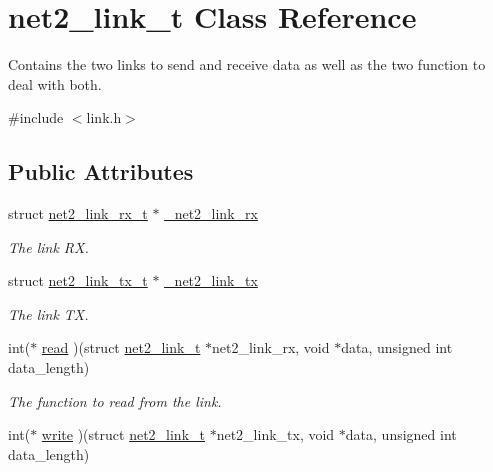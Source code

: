 \hypertarget{structnet2__link__t}{\section{net2\-\_\-link\-\_\-t Class Reference}
\label{structnet2__link__t}
}


Contains the two links to send and receive data as well as the two function to deal with both.  




{\ttfamily \#include $<$link.\-h$>$}

\subsection*{Public Attributes}
\begin{DoxyCompactItemize}
\item 
\hypertarget{structnet2__link__t_ade9ac4a9cf97e38b5fae6e6279a4c6ff}{struct \hyperlink{structnet2__link__rx__t}{net2\-\_\-link\-\_\-rx\-\_\-t} $\ast$ \hyperlink{structnet2__link__t_ade9ac4a9cf97e38b5fae6e6279a4c6ff}{\-\_\-net2\-\_\-link\-\_\-rx}}\label{structnet2__link__t_ade9ac4a9cf97e38b5fae6e6279a4c6ff}

\begin{DoxyCompactList}\small\item\em The link R\-X. \end{DoxyCompactList}\item 
\hypertarget{structnet2__link__t_a5a327b2bafa4b1bc084cb26f3a3955bd}{struct \hyperlink{structnet2__link__tx__t}{net2\-\_\-link\-\_\-tx\-\_\-t} $\ast$ \hyperlink{structnet2__link__t_a5a327b2bafa4b1bc084cb26f3a3955bd}{\-\_\-net2\-\_\-link\-\_\-tx}}\label{structnet2__link__t_a5a327b2bafa4b1bc084cb26f3a3955bd}

\begin{DoxyCompactList}\small\item\em The link T\-X. \end{DoxyCompactList}\item 
\hypertarget{structnet2__link__t_a4a95768a698152d1be5dc2b416581a49}{int($\ast$ \hyperlink{structnet2__link__t_a4a95768a698152d1be5dc2b416581a49}{read} )(struct \hyperlink{structnet2__link__t}{net2\-\_\-link\-\_\-t} $\ast$net2\-\_\-link\-\_\-rx, void $\ast$data, unsigned int data\-\_\-length)}\label{structnet2__link__t_a4a95768a698152d1be5dc2b416581a49}

\begin{DoxyCompactList}\small\item\em The function to read from the link. \end{DoxyCompactList}\item 
\hypertarget{structnet2__link__t_ac1513cd0177b78d51e564224be84ef01}{int($\ast$ \hyperlink{structnet2__link__t_ac1513cd0177b78d51e564224be84ef01}{write} )(struct \hyperlink{structnet2__link__t}{net2\-\_\-link\-\_\-t} $\ast$net2\-\_\-link\-\_\-tx, void $\ast$data, unsigned int data\-\_\-length)}\label{structnet2__link__t_ac1513cd0177b78d51e564224be84ef01}


\end{DoxyCompactItemize}
